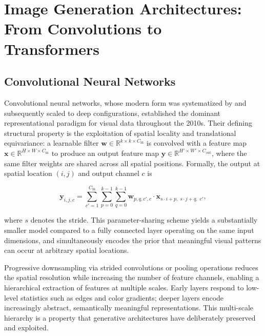 \chapter{Image Generation Architectures: From Convolutions to Transformers}
\label{chap:architectures}

\section{Convolutional Neural Networks}
\label{sec:cnns}

Convolutional neural networks, whose modern form was systematized by and subsequently scaled to deep configurations, established the dominant representational paradigm for visual data throughout the 2010s. Their defining structural property is the exploitation of spatial locality and translational equivariance: a learnable filter $\mathbf{w} \in \mathbb{R}^{k \times k \times C_{\text{in}}}$ is convolved with a feature map $\mathbf{x} \in \mathbb{R}^{H \times W \times C_{\text{in}}}$ to produce an output feature map $\mathbf{y} \in \mathbb{R}^{H' \times W' \times C_{\text{out}}}$, where the same filter weights are shared across all spatial positions. Formally, the output at spatial location $(i, j)$ and output channel $c$ is

\begin{equation}
    \mathbf{y}_{i,j,c} = \sum_{c'=1}^{C_{\text{in}}} \sum_{p=0}^{k-1} \sum_{q=0}^{k-1} \mathbf{w}_{p,q,c',c} \cdot \mathbf{x}_{s \cdot i + p,\; s \cdot j + q,\; c'},
    \label{eq:convolution}
\end{equation}

where $s$ denotes the stride. This parameter-sharing scheme yields a substantially smaller model compared to a fully connected layer operating on the same input dimensions, and simultaneously encodes the prior that meaningful visual patterns can occur at arbitrary spatial locations.

Progressive downsampling via strided convolutions or pooling operations reduces the spatial resolution while increasing the number of feature channels, enabling a hierarchical extraction of features at multiple scales. Early layers respond to low-level statistics such as edges and color gradients; deeper layers encode increasingly abstract, semantically meaningful representations. This multi-scale hierarchy is a property that generative architectures have deliberately preserved and exploited.

